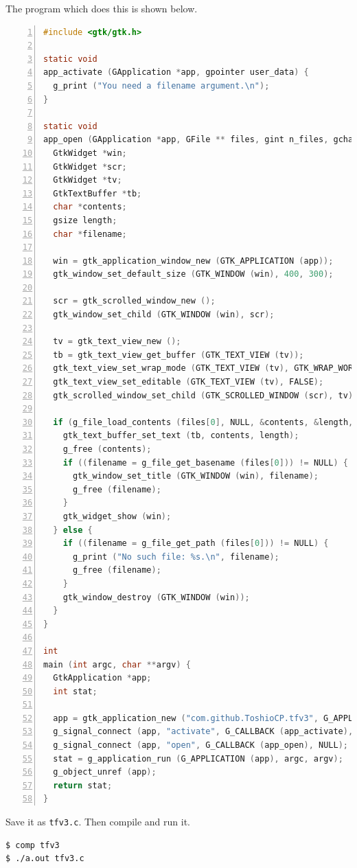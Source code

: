 The program which does this is shown below.

\begin{lstlisting}[language=C, numbers=left]
#include <gtk/gtk.h>

static void
app_activate (GApplication *app, gpointer user_data) {
  g_print ("You need a filename argument.\n");
}

static void
app_open (GApplication *app, GFile ** files, gint n_files, gchar *hint, gpointer user_data) {
  GtkWidget *win;
  GtkWidget *scr;
  GtkWidget *tv;
  GtkTextBuffer *tb;
  char *contents;
  gsize length;
  char *filename;

  win = gtk_application_window_new (GTK_APPLICATION (app));
  gtk_window_set_default_size (GTK_WINDOW (win), 400, 300);

  scr = gtk_scrolled_window_new ();
  gtk_window_set_child (GTK_WINDOW (win), scr);

  tv = gtk_text_view_new ();
  tb = gtk_text_view_get_buffer (GTK_TEXT_VIEW (tv));
  gtk_text_view_set_wrap_mode (GTK_TEXT_VIEW (tv), GTK_WRAP_WORD_CHAR);
  gtk_text_view_set_editable (GTK_TEXT_VIEW (tv), FALSE);
  gtk_scrolled_window_set_child (GTK_SCROLLED_WINDOW (scr), tv);

  if (g_file_load_contents (files[0], NULL, &contents, &length, NULL, NULL)) {
    gtk_text_buffer_set_text (tb, contents, length);
    g_free (contents);
    if ((filename = g_file_get_basename (files[0])) != NULL) {
      gtk_window_set_title (GTK_WINDOW (win), filename);
      g_free (filename);
    }
    gtk_widget_show (win);
  } else {
    if ((filename = g_file_get_path (files[0])) != NULL) {
      g_print ("No such file: %s.\n", filename);
      g_free (filename);
    }
    gtk_window_destroy (GTK_WINDOW (win));
  }
}

int
main (int argc, char **argv) {
  GtkApplication *app;
  int stat;

  app = gtk_application_new ("com.github.ToshioCP.tfv3", G_APPLICATION_HANDLES_OPEN);
  g_signal_connect (app, "activate", G_CALLBACK (app_activate), NULL);
  g_signal_connect (app, "open", G_CALLBACK (app_open), NULL);
  stat = g_application_run (G_APPLICATION (app), argc, argv);
  g_object_unref (app);
  return stat;
}
\end{lstlisting}

Save it as \passthrough{\lstinline!tfv3.c!}. Then compile and run it.

\begin{lstlisting}
$ comp tfv3
$ ./a.out tfv3.c
\end{lstlisting}

